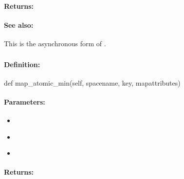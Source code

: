 \paragraph{Returns:}


\paragraph{See also:}  This is the asynchronous form of .

\pagebreak
\subsubsection{}
\label{api:python:map_atomic_min}


\paragraph{Definition:}
\begin{pythoncode}
def map_atomic_min(self, spacename, key, mapattributes)
\end{pythoncode}

\paragraph{Parameters:}
\begin{itemize}[noitemsep]
\item {}\\

\item {}\\

\item {}\\

\end{itemize}

\paragraph{Returns:}


\pagebreak
\subsubsection{}
\label{api:python:async_map_atomic_min}


